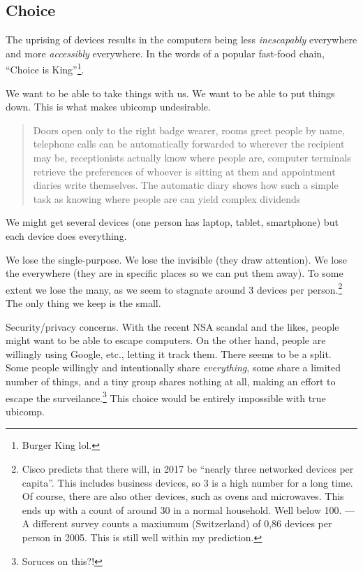 \subsection*{Choice}

The uprising of devices results in the computers being less \emph{inescapably} everywhere and more \emph{accessibly} everywhere. In the words
of a popular fast-food chain, ``Choice is King''\footnote{Burger King lol.}.

We want to be able to take things with us. We want to be able to put things down. This is what makes ubicomp undesirable.

\begin{quote}
    Doors open only to the right badge wearer, rooms greet people by name, telephone calls can be automatically forwarded to wherever the recipient may be, receptionists actually know where people are, computer terminals retrieve the preferences of whoever is sitting at them and appointment diaries write themselves. The automatic diary shows how such a simple task as knowing where people are can yield complex dividends\cite{weiser91}
\end{quote}

We might get several devices (one person has laptop, tablet, smartphone) but each device does everything.

We lose the single-purpose. We lose the invisible (they draw attention). We lose the everywhere (they are in specific places
so we can put them away). To some extent we lose the many, as we seem to stagnate around 3 devices per person.\footnote{Cisco
predicts that there will, in 2017 be ``nearly three networked devices per capita''. This includes business devices, so 3 is a
high number for a long time.\cite{cisco} Of course, there are also other devices, such as ovens and microwaves. This ends up
with a count of around 30 in a normal household. Well below 100. --- A different survey counts a maxiumum (Switzerland) of
0,86 devices per person in 2005. This is still well within my prediction.\cite{nationmaster}} The only thing we keep is the small.

Security/privacy concerns. With the recent NSA scandal and the likes, people might want to be able to escape computers.
On the other hand, people are willingly using Google, etc., letting it track them. There seems to be a split. Some people
willingly and intentionally share \emph{everything}, some share a limited number of things, and a tiny group shares nothing
at all, making an effort to escape the surveilance.\footnote{Soruces on this?!} This choice would be entirely impossible
with true ubicomp.

